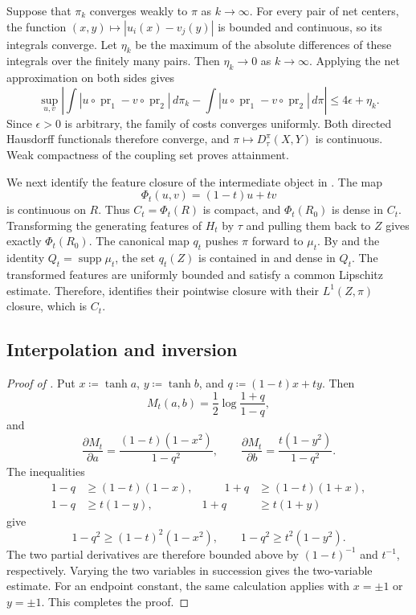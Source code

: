 \documentclass[10pt,a4paper]{amsart}
\DeclareMathOperator{\pr}{pr}
\DeclareMathOperator{\supp}{supp}
\begin{document}
Suppose that $\pi_k$ converges weakly to $\pi$ as $k\to\infty$. For every pair of net centers, the function $(x,y)\mapsto|u_i(x)-v_j(y)|$ is bounded and continuous, so its integrals converge. Let $\eta_k$ be the maximum of the absolute differences of these integrals over the finitely many pairs. Then $\eta_k\to0$ as $k\to\infty$. Applying the net approximation on both sides gives
\[
\sup_{u,v}\left|
\int|u\circ\pr_1-v\circ\pr_2|\,d\pi_k
-\int|u\circ\pr_1-v\circ\pr_2|\,d\pi
\right|\leq4\epsilon+\eta_k.
\]
Since $\epsilon>0$ is arbitrary, the family of costs converges uniformly. Both directed Hausdorff functionals therefore converge, and $\pi\mapsto D_\tau^\pi(X,Y)$ is continuous. Weak compactness of the coupling set \cite[Lemma~2.10]{gds1} proves attainment.

We next identify the feature closure of the intermediate object in . The map
\[
\Phi_t(u,v)=(1-t)u+tv
\]
is continuous on $R$. Thus $C_t=\Phi_t(R)$ is compact, and $\Phi_t(R_0)$ is dense in $C_t$. Transforming the generating features of $H_t$ by $\tau$ and pulling them back to $Z$ gives exactly $\Phi_t(R_0)$. The canonical map $q_t$ pushes $\pi$ forward to $\mu_t$. By  and the identity $Q_t=\supp\mu_t$, the set $q_t(Z)$ is contained in and dense in $Q_t$. The transformed features are uniformly bounded and satisfy a common Lipschitz estimate. Therefore,  identifies their pointwise closure with their $L^1(Z,\pi)$ closure, which is $C_t$.

\subsection{Interpolation and inversion}
\label{subsec:app-interpolation-inversion}

\begin{proof}[Proof of ]
Put $x\coloneqq\tanh a$, $y\coloneqq\tanh b$, and $q\coloneqq(1-t)x+ty$. Then
\[
M_t(a,b)=\frac12\log\frac{1+q}{1-q},
\]
and
\[
\frac{\partial M_t}{\partial a}
=\frac{(1-t)(1-x^2)}{1-q^2},\qquad
\frac{\partial M_t}{\partial b}
=\frac{t(1-y^2)}{1-q^2}.
\]
The inequalities
\[
\begin{aligned}
1-q&\geq(1-t)(1-x),&\qquad 1+q&\geq(1-t)(1+x),\\
1-q&\geq t(1-y),&1+q&\geq t(1+y)
\end{aligned}
\]
give
\[
1-q^2\geq(1-t)^2(1-x^2),\qquad
1-q^2\geq t^2(1-y^2).
\]
The two partial derivatives are therefore bounded above by $(1-t)^{-1}$ and $t^{-1}$, respectively. Varying the two variables in succession gives the two-variable estimate. For an endpoint constant, the same calculation applies with $x=\pm1$ or $y=\pm1$. This completes the proof.
\end{proof}
\end{document}
